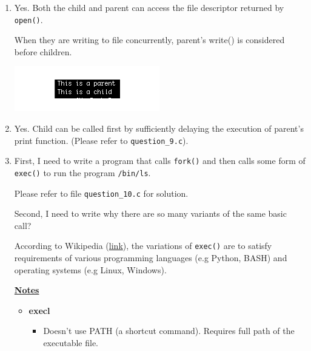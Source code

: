 \documentclass[12pt]{article}
\begin{document}
\begin{enumerate}[1.]
    \item

    Yes. Both the child and parent can access the file descriptor returned by \texttt{open()}.

    \bigskip

    When they are writing to file concurrently, parent's write() is considered before children.

    \bigskip

    \begin{center}
    \includegraphics[width=0.5\linewidth]{images/worksheet_2_solution_16.png}
    \end{center}

    \item

    Yes. Child can be called first by sufficiently delaying the execution of parent's print function.
    (Please refer to \texttt{question\_9.c}).

    \item

    First, I need to write a program that calls \texttt{fork()} and then calls some
    form of \texttt{exec()} to run the program \texttt{/bin/ls}.

    \bigskip

    Please refer to file \texttt{question\_10.c} for solution.

    \bigskip

    Second, I need to write why there are so many variants of the same basic call?

    \bigskip

    According to Wikipedia (\href{https://en.wikipedia.org/wiki/Exec_(system_call)#C_language_prototypes}{link}),
    the variations of \texttt{exec()} are to satisfy requirements of various programming languages (e.g Python, BASH)
    and operating systems (e.g Linux, Windows).

    \bigskip

    \underline{\textbf{Notes}}

    \bigskip

    \begin{itemize}
        \item \textbf{execl}

        \begin{itemize}
            \item Doesn't use PATH (a shortcut command). Requires full path of the executable file.


\end{itemize}
\end{itemize}
\end{enumerate}
\end{document}
